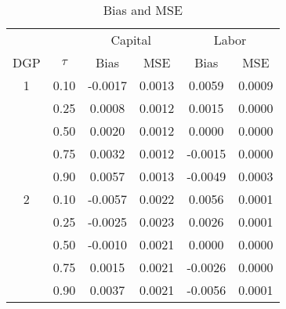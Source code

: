\begin{table}[ht]
\centering
\caption{Bias and MSE} 
\begin{tabular}{cccccc}
  \hline\hline & & \multicolumn{2}{c}{Capital} & \multicolumn{2}{c}{Labor} \\ \cmidrule(lr){3-4} \cmidrule(lr){5-6}DGP & $\tau$ & Bias & MSE & Bias & MSE \\ 
  \hline
1 & 0.10 & -0.0017 & 0.0013 & 0.0059 & 0.0009 \\ 
   & 0.25 & 0.0008 & 0.0012 & 0.0015 & 0.0000 \\ 
   & 0.50 & 0.0020 & 0.0012 & 0.0000 & 0.0000 \\ 
   & 0.75 & 0.0032 & 0.0012 & -0.0015 & 0.0000 \\ 
   & 0.90 & 0.0057 & 0.0013 & -0.0049 & 0.0003 \\ 
  2 & 0.10 & -0.0057 & 0.0022 & 0.0056 & 0.0001 \\ 
   & 0.25 & -0.0025 & 0.0023 & 0.0026 & 0.0001 \\ 
   & 0.50 & -0.0010 & 0.0021 & 0.0000 & 0.0000 \\ 
   & 0.75 & 0.0015 & 0.0021 & -0.0026 & 0.0000 \\ 
   & 0.90 & 0.0037 & 0.0021 & -0.0056 & 0.0001 \\ 
   \hline
\end{tabular}
\end{table}
